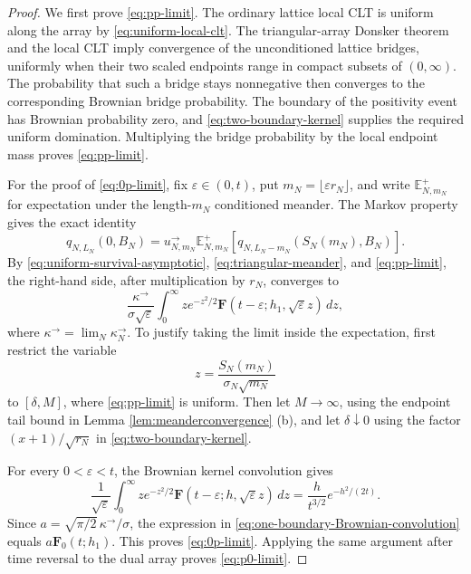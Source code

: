 \documentclass[11pt]{article}
\theoremstyle{plain}
\theoremstyle{definition}
\theoremstyle{remark}
\newcommand{\Ee}{\mathbb E}
\begin{document}
\begin{proof}
We first prove \eqref{eq:pp-limit}.  The ordinary lattice local CLT is
uniform along the array by \eqref{eq:uniform-local-clt}.  The
triangular-array Donsker theorem and
the local CLT imply convergence of the unconditioned lattice bridges,
uniformly when their two scaled endpoints range in compact subsets of
\((0,\infty)\).  The probability that such a bridge stays nonnegative
then converges to the corresponding Brownian bridge probability.  The
boundary of the positivity event has Brownian probability zero, and
\eqref{eq:two-boundary-kernel} supplies the required uniform domination.
Multiplying the bridge probability by the local endpoint mass proves
\eqref{eq:pp-limit}.  

For the proof of \eqref{eq:0p-limit}, fix \(\varepsilon\in(0,t)\), put
\(m_N=\lfloor\varepsilon r_N\rfloor\), and write
\(\Ee_{N,m_N}^{+}\) for expectation under the length-\(m_N\) conditioned
meander.  The Markov
property gives the exact identity
\begin{equation*}
 q_{N,L_N}(0,B_N)
 =u_{N,m_N}^{\rightarrow}
 \Ee_{N,m_N}^{+}\!\left[
 q_{N,L_N-m_N}(S_N(m_N),B_N)
 \right].
\end{equation*}
By \eqref{eq:uniform-survival-asymptotic},
\eqref{eq:triangular-meander}, and \eqref{eq:pp-limit}, the right-hand
side, after multiplication by \(r_N\), converges to
\begin{equation}
 \frac{\kappa^{\rightarrow}}{\sigma\sqrt\varepsilon}
 \int_0^\infty z e^{-z^2/2}
 \mathbf F(t-\varepsilon;h_1,\sqrt\varepsilon z)\,dz,
 \label{eq:one-boundary-Brownian-convolution}
\end{equation}
where \(\kappa^{\rightarrow}=\lim_N\kappa_N^{\rightarrow}\).
To justify taking the limit inside the expectation, first restrict the
variable
\[
 z=\frac{S_N(m_N)}{\sigma_N\sqrt{m_N}}
\]
to \([\delta,M]\), where
\eqref{eq:pp-limit} is uniform.  Then let \(M\to\infty\), using the
endpoint tail bound in Lemma \ref{lem:meanderconvergence} (b), and let \(\delta\downarrow0\) using
the factor \((x+1)/\sqrt{r_N}\) in
\eqref{eq:two-boundary-kernel}.  

For every \(0<\varepsilon<t\), the Brownian kernel convolution gives
\begin{equation*}
 \frac1{\sqrt\varepsilon}
 \int_0^\infty z e^{-z^2/2}
 \mathbf F(t-\varepsilon;h,\sqrt\varepsilon z)\,dz
 =\frac{h}{t^{3/2}}e^{-h^2/(2t)}.
\end{equation*}
Since
\(a=\sqrt{\pi/2}\,\kappa^{\rightarrow}/\sigma\), the expression in
\eqref{eq:one-boundary-Brownian-convolution} equals
\(a\mathbf F_0(t;h_1)\).  This proves \eqref{eq:0p-limit}.  Applying the
same argument after time reversal to the dual array proves
\eqref{eq:p0-limit}.


\end{proof}
\end{document}
